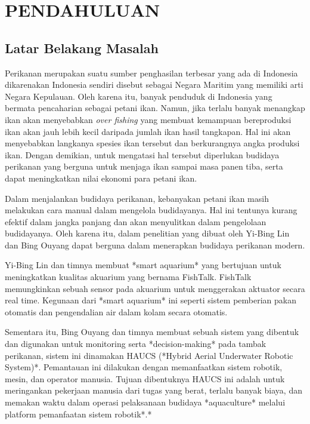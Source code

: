 
\chapter{PENDAHULUAN}

\section{Latar Belakang Masalah}

Perikanan merupakan suatu sumber penghasilan terbesar yang ada di Indonesia dikarenakan Indonesia sendiri disebut sebagai Negara Maritim yang memiliki arti Negara Kepulauan. Oleh karena itu, banyak penduduk di Indonesia yang bermata pencaharian sebagai petani ikan. Namun, jika terlalu banyak menangkap ikan akan menyebabkan \textit{over fishing} yang membuat kemampuan bereproduksi ikan akan jauh lebih kecil daripada jumlah ikan hasil tangkapan. Hal ini akan menyebabkan langkanya spesies ikan tersebut dan berkurangnya angka produksi ikan. Dengan demikian, untuk mengatasi hal tersebut diperlukan budidaya perikanan yang berguna untuk menjaga ikan sampai masa panen tiba, serta dapat meningkatkan nilai ekonomi para petani ikan.

Dalam menjalankan budidaya perikanan, kebanyakan petani ikan masih melakukan cara manual dalam mengelola budidayanya. Hal ini tentunya kurang efektif dalam jangka panjang dan akan menyulitkan dalam pengelolaan budidayanya. Oleh karena itu, dalam penelitian yang dibuat oleh Yi-Bing Lin dan Bing Ouyang dapat berguna dalam menerapkan budidaya perikanan modern.

Yi-Bing Lin dan timnya membuat *smart aquarium* yang bertujuan untuk meningkatkan kualitas akuarium yang bernama FishTalk. FishTalk memungkinkan sebuah sensor pada akuarium untuk menggerakan aktuator secara real time. Kegunaan dari *smart aquarium* ini seperti sistem pemberian pakan otomatis dan pengendalian air dalam kolam secara otomatis.

Sementara itu, Bing Ouyang dan timnya membuat sebuah sistem yang dibentuk dan digunakan untuk monitoring serta *decision-making* pada tambak perikanan, sistem ini dinamakan HAUCS (*Hybrid Aerial Underwater Robotic System)*. Pemantauan ini dilakukan dengan memanfaatkan sistem robotik, mesin, dan operator manusia. Tujuan dibentuknya HAUCS ini adalah untuk meringankan pekerjaan manusia dari tugas yang berat, terlalu banyak biaya, dan memakan waktu dalam operasi pelaksanaan budidaya *aquaculture* melalui platform pemanfaatan sistem robotik*.*

